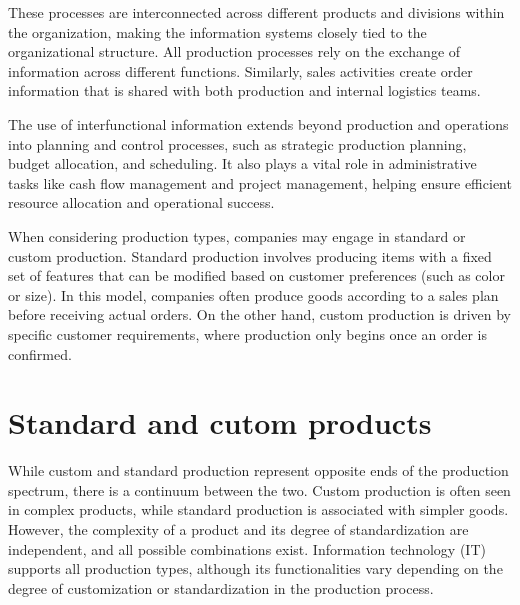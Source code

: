 These processes are interconnected across different products and divisions within the organization, making the information systems closely tied to the organizational structure. 
All production processes rely on the exchange of information across different functions. 
Similarly, sales activities create order information that is shared with both production and internal logistics teams.

The use of interfunctional information extends beyond production and operations into planning and control processes, such as strategic production planning, budget allocation, and scheduling. 
It also plays a vital role in administrative tasks like cash flow management and project management, helping ensure efficient resource allocation and operational success.

When considering production types, companies may engage in standard or custom production. 
Standard production involves producing items with a fixed set of features that can be modified based on customer preferences (such as color or size).
In this model, companies often produce goods according to a sales plan before receiving actual orders. 
On the other hand, custom production is driven by specific customer requirements, where production only begins once an order is confirmed.

\section{Standard and cutom products}
While custom and standard production represent opposite ends of the production spectrum, there is a continuum between the two. 
Custom production is often seen in complex products, while standard production is associated with simpler goods. 
However, the complexity of a product and its degree of standardization are independent, and all possible combinations exist.
Information technology (IT) supports all production types, although its functionalities vary depending on the degree of customization or standardization in the production process.